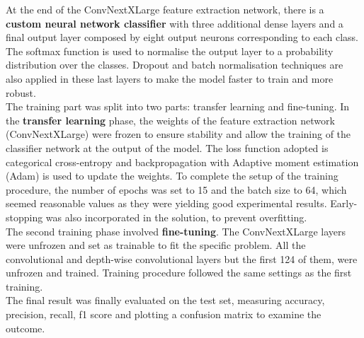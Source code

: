 \documentclass[11pt]{article}
\begin{document}
\begin{multicols}{2}
        At the end of the ConvNextXLarge feature extraction network, there is a \textbf{custom neural network classifier} with three additional dense layers and a final output layer composed by eight output neurons corresponding to each class. The softmax function is used to normalise the output layer to a probability distribution over the classes. Dropout and batch normalisation techniques are also applied in these last layers to make the model faster to train and more robust. \\
        The training part was split into two parts: transfer learning and fine-tuning. In the \textbf{transfer learning} phase, the weights of the feature extraction network (ConvNextXLarge) were frozen to ensure stability and allow the training of the classifier network at the output of the model. The loss function adopted is categorical cross-entropy and backpropagation with Adaptive moment estimation (Adam) is used to update the weights. To complete the setup of the training procedure, the number of epochs was set to 15 and the batch size to 64, \color{red}which seemed reasonable values as they were yielding good experimental results. \color{black}
        Early-stopping was also incorporated in the solution, to prevent overfitting. \\
      The second training phase involved \textbf{fine-tuning}. The ConvNextXLarge layers were unfrozen and set as trainable to fit the specific problem. All the convolutional and depth-wise convolutional layers but the first 124 of them, were unfrozen and trained. Training procedure followed the same settings as the first training. \\    
        The final result was finally evaluated on the test set, measuring accuracy, precision, recall, f1 score and plotting a confusion matrix to examine the outcome.


\end{multicols}
\end{document}
